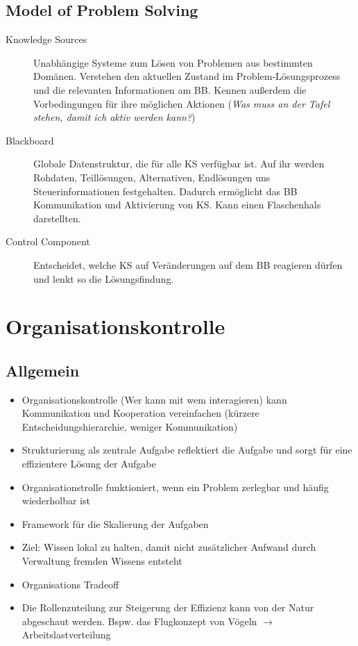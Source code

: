\documentclass{article} %
\begin{document}
	\subsection{Model of Problem Solving}
	\begin{description}
		\item[Knowledge Sources] Unabhängige Systeme zum Lösen von Problemen aus bestimmten Domänen.
		Verstehen den aktuellen Zustand im Problem-Lösungsprozess und die relevanten Informationen am BB.
		Kennen außerdem die Vorbedingungen für ihre möglichen Aktionen (\emph{Was muss an der Tafel stehen, damit ich aktiv werden kann?})
		\item[Blackboard] Globale Datenstruktur, die für alle KS verfügbar ist.
		Auf ihr werden Rohdaten, Teillösungen, Alternativen, Endlösungen uns Steuerinformationen festgehalten.
		Dadurch ermöglicht das BB Kommunikation und Aktivierung von KS.
		Kann einen Flaschenhals darstellten.
		\item[Control Component] Entscheidet, welche KS auf Veränderungen auf dem BB reagieren dürfen und lenkt so die Lösungsfindung.
	\end{description}
	\section{Organisationskontrolle}
	\subsection{Allgemein}
	\begin{itemize}
		\item Organisationskontrolle (Wer kann mit wem interagieren) kann Kommunikation und Kooperation vereinfachen (kürzere Entscheidungshierarchie, weniger Kommunikation)
		\item Strukturierung als zentrale Aufgabe reflektiert die Aufgabe und sorgt für eine effizientere Lösung der Aufgabe
		\item Organisationstrolle funktioniert, wenn ein Problem zerlegbar und häufig wiederholbar ist
		\item Framework für die Skalierung der Aufgaben
		\item Ziel: Wissen lokal zu halten, damit nicht zusätzlicher Aufwand durch Verwaltung fremden Wissens entsteht
		\item Organisations Tradeoff
		\item Die Rollenzuteilung zur Steigerung der Effizienz kann von der Natur abgeschaut werden. Bspw. das Flugkonzept von Vögeln $\rightarrow$ Arbeitslastverteilung
	\end{itemize}
\end{document}
